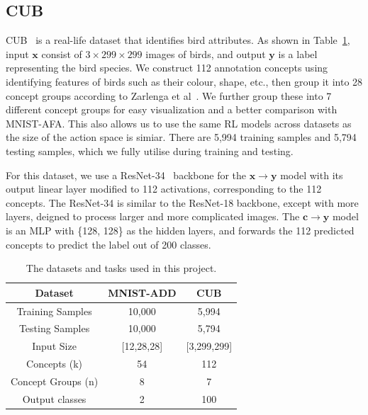 \subsection{CUB}

CUB~\cite{cub} is a real-life dataset that identifies bird attributes.
As shown in Table~\ref{table:datasets}, 
input $\mathbf{x}$ consist of $3 \times 299 \times 299$ images of 
 birds, and output $\mathbf{y}$ is a label representing the bird species.
We construct
112 annotation concepts 
using identifying features of birds such as their colour, shape, etc.,
then group it into 28 concept groups according
to Zarlenga et al~\cite{intcem}. We further group these
into 7 different concept groups for easy visualization and a better comparison
with MNIST-AFA. This also allows us to use the same RL models across datasets
as the size of the action space is simiar. There are 
5,994 training samples and 5,794 testing samples, which we fully
utilise during training and testing.

For this dataset, we use a ResNet-34~\cite{resnet} backbone for the $\mathbf{x} \to \mathbf{y}$
model with its output linear layer modified to 112 activations, corresponding
to the 112 concepts. The ResNet-34 is similar to the ResNet-18 backbone,
except with more layers, deigned to process larger and more complicated images.
The $\mathbf{c} \to \mathbf{y}$ model is an MLP with \{128, 128\} as the hidden
layers, and forwards the 112 predicted concepts to predict the label out of 200 classes.


\begin{table}
    \centering
    \renewcommand{\arraystretch}{1.5}
    \begin{tabular}{c|cc}

    Dataset & MNIST-ADD & CUB \\
    \hline
    Training Samples & 10,000 & 5,994 \\
    Testing Samples & 10,000 & 5,794 \\
    Input Size & [12,28,28] & [3,299,299]\\
    Concepts (k) & 54 & 112 \\
    Concept Groups (n) & 8 & 7 \\
    Output classes & 2 & 100
    \end{tabular}
    \caption{The datasets and tasks used in this project.}
    \label{table:datasets}
\end{table}

